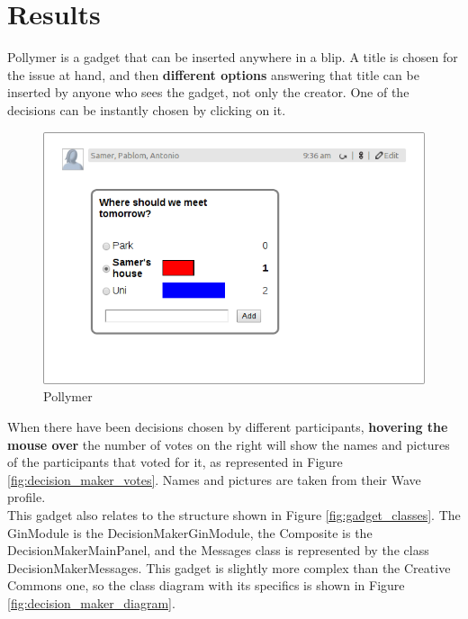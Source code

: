 \section{Results}
Pollymer is a gadget that can be inserted anywhere in a blip. A title is chosen for the issue at hand, and then \textbf{different options} answering that title can be inserted by anyone who sees the gadget, not only the creator. One of the decisions can be instantly chosen by clicking on it.
\begin{figure}[H]
  \center
    \includegraphics[keepaspectratio, scale=0.265]{Media/Captures/Extensions/DecisionMakerGadget.png}
  \caption{Pollymer}
  \label{fig:decision_maker_gadget}
\end{figure}
When there have been decisions chosen by different participants, \textbf{hovering the mouse over} the number of votes on the right will show the names and pictures of the participants that voted for it, as represented in Figure \ref{fig:decision_maker_votes}. Names and pictures are taken from their Wave profile.\\[.2cm]
This gadget also relates to the structure shown in Figure \ref{fig:gadget_classes}. The GinModule is the DecisionMakerGinModule, the Composite is the DecisionMakerMainPanel, and the Messages class is represented by the class DecisionMakerMessages. This gadget is slightly more complex than the Creative Commons one, so the class diagram with its specifics is shown in Figure \ref{fig:decision_maker_diagram}.\\[.2cm]
